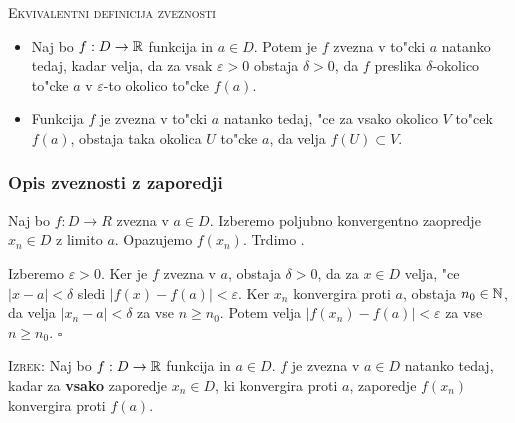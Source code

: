 \textsc{Ekvivalentni definicija zveznosti}
\begin{itemize}
	\item Naj bo $f: D \to \mathbb{R}$ funkcija in $a \in D$. Potem je $f$ zvezna v to"cki $a$ natanko tedaj, kadar velja, da za vsak $\varepsilon > 0$ obstaja $\delta > 0$, da $f$ preslika $\delta$-okolico to"cke $a$ v $\varepsilon$-to okolico to"cke $f(a)$.
	
	\item Funkcija $f$ je zvezna v to"cki $a$ natanko tedaj, "ce za vsako okolico $V$ to"cek $f(a)$, obstaja taka okolica $U$ to"cke $a$, da velja $f(U) \subset V$.
\end{itemize}
%
\subsubsection{Opis zveznosti z zaporedji}
Naj bo $f: D \to R$ zvezna v $a \in D$. Izberemo poljubno konvergentno zaopredje $x_n \in D$ z limito $a$. Opazujemo $f(x_n)$. Trdimo .

Izberemo $\varepsilon > 0$. Ker je $f$ zvezna v $a$, obstaja $\delta > 0$, da za $x \in D$ velja, "ce $|x -a| < \delta$ sledi $|f(x) - f(a)| < \varepsilon$. Ker $x_n$ konvergira proti $a$, obstaja $n_0 \in \mathbb{N}$, da velja $|x_n - a| < \delta$ za vse $n \geq n_0$. Potem velja $|f(x_n) - f(a)| < \varepsilon$ za vse $n \geq n_0$. \hfill $\square$

\textsc{Izrek:} Naj bo $f: D \to \mathbb{R}$ funkcija in $a \in D$. $f$ je zvezna v $a \in D$ natanko tedaj, kadar za \textbf{vsako} zaporedje $x_n \in D$, ki konvergira proti $a$, zaporedje $f(x_n)$ konvergira proti $f(a)$.

